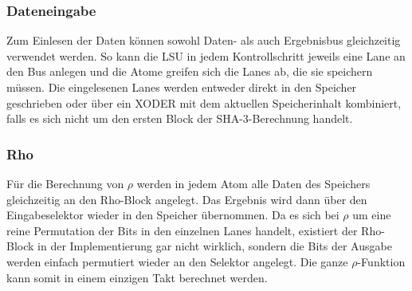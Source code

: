 \subsubsection{Dateneingabe}
Zum Einlesen der Daten können sowohl Daten- als auch Ergebnisbus gleichzeitig verwendet werden.
So kann die LSU in jedem Kontrollschritt jeweils eine Lane an den Bus anlegen und die Atome greifen sich die Lanes ab, die sie speichern müssen.
Die eingelesenen Lanes werden entweder direkt in den Speicher geschrieben oder über ein XODER mit dem aktuellen Speicherinhalt kombiniert,
falls es sich nicht um den ersten Block der SHA-3-Berechnung handelt.
\subsubsection{Rho}
Für die Berechnung von $\rho$ werden in jedem Atom alle Daten des Speichers gleichzeitig an den Rho-Block angelegt.
Das Ergebnis wird dann über den Eingabeselektor wieder in den Speicher übernommen. Da es sich bei $\rho$ um eine reine Permutation der Bits
in den einzelnen Lanes handelt, existiert der Rho-Block in der Implementierung gar nicht wirklich, sondern die Bits der Ausgabe werden einfach
permutiert wieder an den Selektor angelegt. Die ganze $\rho$-Funktion kann somit in einem einzigen Takt berechnet werden.

